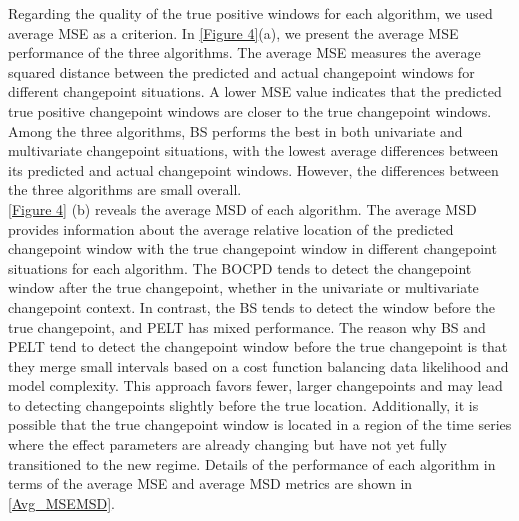\documentclass[]{interact}
\theoremstyle{plain}%
\theoremstyle{definition}
\theoremstyle{remark}
\begin{document}
    Regarding the quality of the true positive windows for each algorithm, we used average MSE as a criterion. In \autoref{Figure 4}(a), we present the average MSE performance of the three algorithms. The average MSE measures the average squared distance between the predicted and actual changepoint windows for different changepoint situations. A lower MSE value indicates that the predicted true positive changepoint windows are closer to the true changepoint windows. Among the three algorithms, BS performs the best in both univariate and multivariate changepoint situations, with the lowest average differences between its predicted and actual changepoint windows. However, the differences between the three algorithms are small overall. \\
    
    \autoref{Figure 4} (b) reveals the average MSD of each algorithm. The average MSD provides information about the average relative location of the predicted changepoint window with the true changepoint window in different changepoint situations for each algorithm. The BOCPD tends to detect the changepoint window after the true changepoint, whether in the univariate or multivariate changepoint context. In contrast, the BS tends to detect the window before the true changepoint, and PELT has mixed performance. The reason why BS and PELT tend to detect the changepoint window before the true changepoint is that they merge small intervals based on a cost function balancing data likelihood and model complexity\cite{killickOptimalDetectionChangepoints2012}. This approach favors fewer, larger changepoints and may lead to detecting changepoints slightly before the true location\citealp{fearnheadChangepointDetectionPresence2019}. Additionally, it is possible that the true changepoint window is located in a region of the time series where the effect parameters are already changing but have not yet fully transitioned to the new regime. Details of the performance of each algorithm in terms of the average MSE and average MSD metrics are shown in \autoref{Avg_MSEMSD}.
\end{document}
